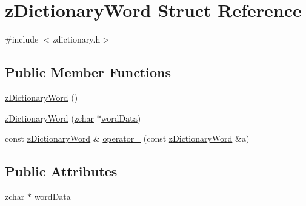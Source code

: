\hypertarget{structz_dictionary_word}{\section{z\-Dictionary\-Word Struct Reference}
\label{structz_dictionary_word}
}


{\ttfamily \#include $<$zdictionary.\-h$>$}

\subsection*{Public Member Functions}
\begin{DoxyCompactItemize}
\item 
\hyperlink{structz_dictionary_word_ac7a4bfd1848c4bb17eefa6933ec23495}{z\-Dictionary\-Word} ()
\item 
\hyperlink{structz_dictionary_word_a5680db4b9d0fd362ba9b50069d64540a}{z\-Dictionary\-Word} (\hyperlink{zglobal_8h_aef68b14f6fcd84f18d5b177486e4999b}{zchar} $\ast$\hyperlink{structz_dictionary_word_a052383f6650a13c20731dc2e790614ab}{word\-Data})
\item 
const \hyperlink{structz_dictionary_word}{z\-Dictionary\-Word} \& \hyperlink{structz_dictionary_word_a8c2f286835d48c3ab46f9530d91c2219}{operator=} (const \hyperlink{structz_dictionary_word}{z\-Dictionary\-Word} \&a)
\end{DoxyCompactItemize}
\subsection*{Public Attributes}
\begin{DoxyCompactItemize}
\item 
\hyperlink{zglobal_8h_aef68b14f6fcd84f18d5b177486e4999b}{zchar} $\ast$ \hyperlink{structz_dictionary_word_a052383f6650a13c20731dc2e790614ab}{word\-Data}
\end{DoxyCompactItemize}


